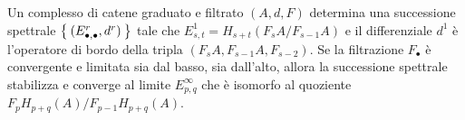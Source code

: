 \begin{thm}
	Un complesso di catene graduato e filtrato $(A,d,F)$ determina una successione spettrale
	$\Set{(E_{\bullet,\bullet}^{r},d^{r})}$ tale che
	$E_{s,t}^{1} = H_{s+t}(F_{s}A/F_{s-1}A)$ e il differenziale $d^{1}$ è
	l'operatore di bordo della tripla $(F_{s}A,F_{s-1}A,F_{s-2})$.
	Se la filtrazione $F_{\bullet}$ è convergente e limitata sia dal basso, sia dall'alto,
	allora la successione spettrale stabilizza e converge al limite $E^{\infty}_{p,q}$
	che è isomorfo al quoziente $F_{p}H_{p+q}(A)/F_{p-1}H_{p+q}(A)$.
\end{thm}








